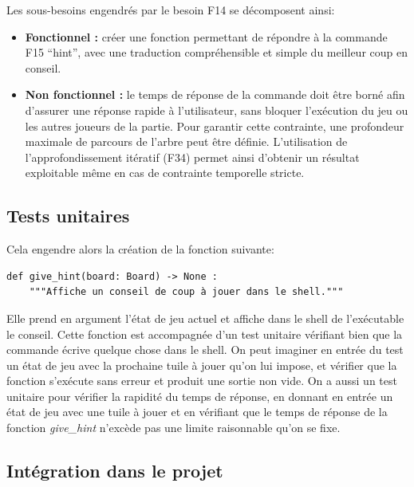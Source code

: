 \documentclass[11pt]{article}
\begin{document}
\normalsize
Les sous-besoins engendrés par le besoin F14 se décomposent ainsi:
\begin{itemize}
  \item[$\bullet$] \textbf{Fonctionnel :} créer une fonction permettant de répondre à la commande F15 ``hint'', avec une traduction compréhensible et simple du meilleur coup en conseil.
  \item[$\bullet$] \textbf{Non fonctionnel :} le temps de réponse de la commande doit être borné afin d’assurer une réponse rapide à l’utilisateur, sans bloquer l’exécution du jeu ou les autres joueurs de la partie. 
Pour garantir cette contrainte, une profondeur maximale de parcours de l’arbre peut être définie. L’utilisation de l’approfondissement itératif (F34) permet ainsi d’obtenir un résultat exploitable même en cas de contrainte temporelle stricte.

\end{itemize}



\subsection{Tests unitaires}

\normalsize
Cela engendre alors la création de la fonction suivante:
{\normalsize
  \begin{verbatim}
def give_hint(board: Board) -> None :
    """Affiche un conseil de coup à jouer dans le shell."""

  \end{verbatim}
}

Elle prend en argument l’état de jeu actuel et affiche dans le shell de l’exécutable le conseil. 
Cette fonction est accompagnée d’un test unitaire vérifiant bien que la commande écrive quelque chose dans le shell. 
On peut imaginer en entrée du test un état de jeu avec la prochaine tuile à jouer qu’on lui impose, et vérifier que la fonction s’exécute sans erreur et produit une sortie non vide.
On a aussi un test unitaire pour vérifier la rapidité du temps de réponse, en donnant en entrée un état de jeu avec une tuile à jouer et en vérifiant que le temps de réponse de la fonction \textit{give\_hint} n’excède pas une limite raisonnable qu’on se fixe.



\subsection{Intégration dans le projet}
\end{document}
